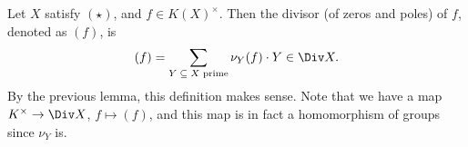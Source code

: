 Let $X$ satisfy $(\star)$, and $f \in K(X)^\times$. Then the divisor (of zeros
and poles) of $f$, denoted as $(f)$, is
\[ (f) = \sum_{\text{$Y \subseteq X$ prime}} \nu_Y(f)\cdot Y \in \Div X. \]
By the previous lemma, this definition makes sense. Note that we have a map
$K^\times \to \Div X$, $f\mapsto (f)$, and this map is in fact a homomorphism of
groups since $\nu_Y$ is.
